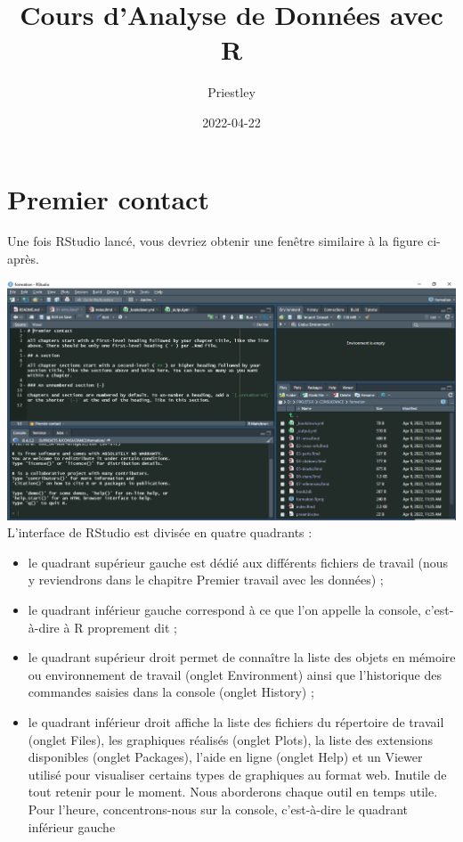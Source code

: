 \documentclass[
]{book}
\title{Cours d'Analyse de Données avec R}
\author{Priestley}
\date{2022-04-22}
\providecommand{\tightlist}{%
  \setlength{\itemsep}{0pt}\setlength{\parskip}{0pt}}
\begin{document}
\maketitle

{
\setcounter{tocdepth}{1}
\tableofcontents
}
\hypertarget{premier-contact}{%
\chapter{Premier contact}\label{premier-contact}}

Une fois RStudio lancé, vous devriez obtenir une fenêtre similaire à la figure ci-après.

\includegraphics[width=1\linewidth]{images/Capture}
L'interface de RStudio est divisée en quatre quadrants :

\begin{itemize}
\tightlist
\item
  le quadrant supérieur gauche est dédié aux différents fichiers de travail (nous y reviendrons dans le chapitre Premier travail avec les données) ;
\item
  le quadrant inférieur gauche correspond à ce que l'on appelle la console, c'est-à-dire à R proprement dit ;
\item
  le quadrant supérieur droit permet de connaître
  la liste des objets en mémoire ou environnement de travail (onglet Environment)
  ainsi que l'historique des commandes saisies dans la console (onglet History) ;
\item
  le quadrant inférieur droit affiche
  la liste des fichiers du répertoire de travail (onglet Files),
  les graphiques réalisés (onglet Plots),
  la liste des extensions disponibles (onglet Packages),
  l'aide en ligne (onglet Help)
  et un Viewer utilisé pour visualiser certains types de graphiques au format web.
  Inutile de tout retenir pour le moment. Nous aborderons chaque outil en temps utile. Pour l'heure, concentrons-nous sur la console, c'est-à-dire le quadrant inférieur gauche
\end{itemize}
\end{document}
